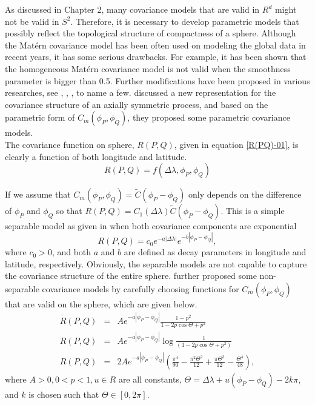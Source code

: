 
As discussed in Chapter 2, many covariance models that are valid in $R^d$ might not be valid in $S^2$. Therefore, it is necessary to develop parametric models that possibly reflect the topological structure of compactness of a sphere. Although the Mat\'{e}rn covariance model has been often used on modeling the global data in recent years, it has some serious drawbacks. For example, it has been shown that the homogeneous Mat\'{e}rn covariance model is not valid when the smoothness parameter is bigger than 0.5. Further modifications have been proposed in various researches, see \cite{Li2013}, \cite{JunStein2008}, \cite{JeongJun2015}, to name a few. \cite{Huang2012} discussed a new representation for the covariance structure of an axially symmetric process, and based on the parametric form of $C_m(\phi_P, \phi_Q)$, they proposed some parametric covariance models. \\
					
The covariance function on sphere, $R(P,Q)$,  given in equation \ref{R(PQ)-01}, is clearly a function of both longitude and latitude.
			\[
				R(P,Q) = f(\Delta\lambda, \phi_P,\phi_Q)
			\]
					
If we assume that $C_m(\phi_P, \phi_Q) = \tilde{C}(\phi_P - \phi_Q)$ only depends on the difference of $\phi_P$ and $\phi_Q$ so that $R(P, Q) = C_1(\Delta \lambda)\tilde{C}(\phi_P - \phi_Q)$. This is a simple separable model as given in \cite{HuangZhangRobeson2011} when both covariance components are exponential
			\[
				R(P, Q) = c_0e^{-a|\Delta \lambda|}e^{-b|\phi_P - \phi_Q|},
			\]
where $c_0 > 0$, and both $a$ and $b$ are defined as decay parameters in longitude and latitude, respectively. Obviously, the separable models are not capable to capture the covariance structure of the entire sphere. \cite{Huang2012} further proposed some non-separable covariance models by carefully choosing functions for $C_m(\phi_P, \phi_Q)$ that are valid on the sphere, which are given below.
			\begin{eqnarray}
				R(P,Q) &=& Ae^{-a|\phi_P-\phi_Q|} \frac{1-p^2}{1-2p \cos\Theta+p^2} \label{model1} \\
				R(P,Q) &=& Ae^{-a|\phi_P-\phi_Q|} \log\frac{1}{(1-2p\cos\Theta + p^2)} \label{model2} \\
				R(P,Q) &=& 2Ae^{-a|\phi_P-\phi_Q|}\left(\frac{\pi^4}{90}-\frac{\pi^2\Theta^2}{12}+\frac{\pi\Theta^3}{12}-\frac{\Theta^4}{48}\right), \label{model3}
			\end{eqnarray}
where $A > 0, 0 < p < 1, u \in R$ are all constants, $\Theta = \Delta\lambda + u(\phi_P - \phi_Q) - 2k\pi$, and $k$ is chosen such that $\Theta \in [0,2\pi]$. \\
			
